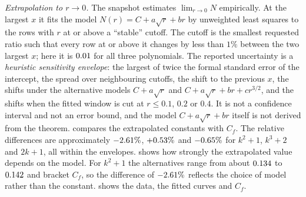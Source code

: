 \emph{Extrapolation to $r\to0$.} The snapshot estimates $\lim_{r\to0}N$ empirically. At the largest $x$ it fits the model $N(r)=C+a\sqrt r+br$ by unweighted least squares to the rows with $r$ at or above a ``stable'' cutoff. The cutoff is the smallest requested ratio such that every row at or above it changes by less than $1\%$ between the two largest $x$; here it is $0.01$ for all three polynomials. The reported uncertainty is a \emph{heuristic sensitivity envelope}: the largest of twice the formal standard error of the intercept, the spread over neighbouring cutoffs, the shift to the previous $x$, the shifts under the alternative models $C+a\sqrt r$ and $C+a\sqrt r+br+cr^{3/2}$, and the shifts when the fitted window is cut at $r\le0.1$, $0.2$ or $0.4$. It is not a confidence interval and not an error bound, and the model $C+a\sqrt r+br$ itself is not derived from the theorem.  compares the extrapolated constants with $C_f$. The relative differences are approximately $-2.61\%$, $+0.53\%$ and $-0.65\%$ for $k^2+1$, $k^3+2$ and $2k+1$, all within the envelopes.  shows how strongly the extrapolated value depends on the model. For $k^2+1$ the alternatives range from about $0.134$ to $0.142$ and bracket $C_f$, so the difference of $-2.61\%$ reflects the choice of model rather than the constant.  shows the data, the fitted curves and $C_f$.

\begin{table}[htbp]
\centering
\small

\caption{Empirical exponents and extrapolated constants from the snapshot fits, compared with $C_f$ from \cref{tab:constants}. ``$\alpha+\beta$'' is the mean of the eight fixed-ratio slopes of $\log V_f$ against $\log x$ (with the across-ratio standard error); ``$\beta$'' is the fixed-$x$ slope against $\log f(y)$ at the largest $x$ (with its regression standard error). The last column is $(C_{\mathrm{extr}}-C_f)$ divided by the heuristic envelope; a value of absolute size at most $1$ means that $C_f$ lies within the envelope.}
\label{tab:fits}
\end{table}

\begin{table}[htbp]
\centering
\footnotesize

\caption{Sensitivity of the extrapolated constant: the primary fit, the two alternative models, the window $r\le0.1$, the lower cutoff $0.005$, and the primary fit at the previous size $x=1.28\cdot10^8$.}
\label{tab:sensitivity}
\end{table}

